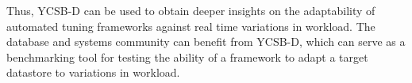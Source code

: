\documentclass[conference]{IEEEtran}
\begin{document}
 Thus, YCSB-D  can be used to obtain deeper insights on the adaptability of automated tuning frameworks against real time variations in workload.
  The database and systems community can benefit from YCSB-D, which can serve as a benchmarking tool for
  testing the ability of a framework to adapt a target datastore to variations in
  workload. %
\end{document}
